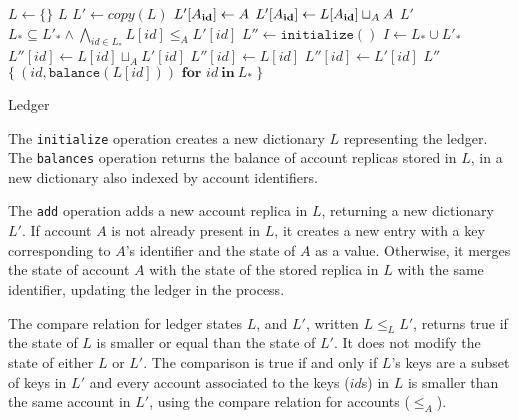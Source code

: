 \documentclass[9pt, oneside]{article}   	%
\begin{document}
\begin{algorithm}
\begin{algorithmic}[1]
    	\State $L \leftarrow \{ \}$ 
    	\State \Return $L$
    \EndFunction
    \State
        \State $L' \leftarrow \textit{copy}(L)$ 
		\State $L'[A_{\scriptsize\textbf{id}}] \leftarrow A$
	\Else
		\State $L'[A_{\scriptsize\textbf{id}}] \leftarrow L[A_{\scriptsize\textbf{id}}] \sqcup_A A$ 
	\EndIf
	\State \Return $L'$
    \EndFunction
    \State
    	\State \Return $L_* \subseteq L'_* \wedge \bigwedge_{id \in L_*} L[id] \leq_A L'[id]$ 
    \EndFunction
    \State
        \State $L'' \leftarrow \texttt{initialize}()$
        \State $I \leftarrow L_* \cup L'_*$
			\State $L''[id] \leftarrow  L[id] \sqcup_A L'[id]$  
			\State $L''[id] \leftarrow L[id]$
		\Else
			\State $L''[id] \leftarrow L'[id]$	
		\EndIf
	\EndFor
	\State \Return $L''$	
    \EndFunction
    \State
        \State \Return $\{~ (\textit{id}, \texttt{balance}(L[id])) \textbf{~for~} id ~\textbf{in}~ L_* ~\}$  
    \EndFunction
\end{algorithmic}
\caption{\label{alg:ledger} Ledger}
\end{algorithm}

The \texttt{initialize} operation creates a new dictionary $L$ representing the ledger. The \texttt{balances} operation returns the balance of account replicas stored in $L$, in a new dictionary also indexed by account identifiers. 

The \texttt{add} operation adds a new account replica in $L$, returning a new dictionary $L'$. If account $A$ is not already present in $L$, it creates a new entry with a key corresponding to $A$'s identifier and the state of $A$ as a value. Otherwise, it merges the state of account $A$ with the state of the stored replica in $L$ with the same identifier, updating the ledger in the process.

The compare relation for ledger states $L$, and $L'$, written $L \leq_L L'$, returns true if the state of $L$ is smaller or equal than the state of $L'$. It does not modify the state of either $L$ or $L'$. The comparison is true if and only if $L$'s keys are a subset of keys in $L'$ and every account associated to the keys ($id$s) in $L$ is smaller than the same account in $L'$, using the compare relation for accounts ($\leq_A$).
\end{document}
